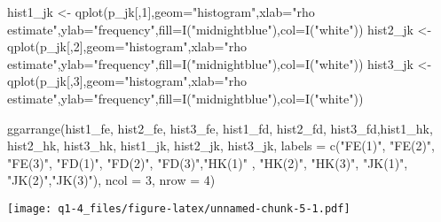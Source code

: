 \documentclass[
]{article}
\newenvironment{Shaded}{\begin{snugshade}}{\end{snugshade}}
\newcommand{\AttributeTok}[1]{\textcolor[rgb]{0.77,0.63,0.00}{#1}}
\newcommand{\DecValTok}[1]{\textcolor[rgb]{0.00,0.00,0.81}{#1}}
\newcommand{\FunctionTok}[1]{\textcolor[rgb]{0.00,0.00,0.00}{#1}}
\newcommand{\NormalTok}[1]{#1}
\newcommand{\OtherTok}[1]{\textcolor[rgb]{0.56,0.35,0.01}{#1}}
\newcommand{\StringTok}[1]{\textcolor[rgb]{0.31,0.60,0.02}{#1}}
\begin{document}
\begin{Shaded}
\begin{Highlighting}[]
\NormalTok{hist1\_jk }\OtherTok{\textless{}{-}} \FunctionTok{qplot}\NormalTok{(p\_jk[,}\DecValTok{1}\NormalTok{],}\AttributeTok{geom=}\StringTok{"histogram"}\NormalTok{,}\AttributeTok{xlab=}\StringTok{"rho estimate"}\NormalTok{,}\AttributeTok{ylab=}\StringTok{"frequency"}\NormalTok{,}\AttributeTok{fill=}\FunctionTok{I}\NormalTok{(}\StringTok{"midnightblue"}\NormalTok{),}\AttributeTok{col=}\FunctionTok{I}\NormalTok{(}\StringTok{"white"}\NormalTok{)) }
\NormalTok{hist2\_jk }\OtherTok{\textless{}{-}} \FunctionTok{qplot}\NormalTok{(p\_jk[,}\DecValTok{2}\NormalTok{],}\AttributeTok{geom=}\StringTok{"histogram"}\NormalTok{,}\AttributeTok{xlab=}\StringTok{"rho estimate"}\NormalTok{,}\AttributeTok{ylab=}\StringTok{"frequency"}\NormalTok{,}\AttributeTok{fill=}\FunctionTok{I}\NormalTok{(}\StringTok{"midnightblue"}\NormalTok{),}\AttributeTok{col=}\FunctionTok{I}\NormalTok{(}\StringTok{"white"}\NormalTok{)) }
\NormalTok{hist3\_jk }\OtherTok{\textless{}{-}} \FunctionTok{qplot}\NormalTok{(p\_jk[,}\DecValTok{3}\NormalTok{],}\AttributeTok{geom=}\StringTok{"histogram"}\NormalTok{,}\AttributeTok{xlab=}\StringTok{"rho estimate"}\NormalTok{,}\AttributeTok{ylab=}\StringTok{"frequency"}\NormalTok{,}\AttributeTok{fill=}\FunctionTok{I}\NormalTok{(}\StringTok{"midnightblue"}\NormalTok{),}\AttributeTok{col=}\FunctionTok{I}\NormalTok{(}\StringTok{"white"}\NormalTok{)) }

\FunctionTok{ggarrange}\NormalTok{(hist1\_fe, hist2\_fe, hist3\_fe, hist1\_fd, hist2\_fd, hist3\_fd,hist1\_hk, }
\NormalTok{          hist2\_hk, hist3\_hk, hist1\_jk, hist2\_jk, hist3\_jk,}
          \AttributeTok{labels =} \FunctionTok{c}\NormalTok{(}\StringTok{"FE(1)"}\NormalTok{, }\StringTok{"FE(2)"}\NormalTok{, }\StringTok{"FE(3)"}\NormalTok{, }\StringTok{"FD(1)"}\NormalTok{, }\StringTok{"FD(2)"}\NormalTok{, }\StringTok{"FD(3)"}\NormalTok{,}\StringTok{"HK(1)"}
\NormalTok{                     , }\StringTok{"HK(2)"}\NormalTok{,  }\StringTok{"HK(3)"}\NormalTok{, }\StringTok{"JK(1)"}\NormalTok{, }\StringTok{"JK(2)"}\NormalTok{,}\StringTok{"JK(3)"}\NormalTok{),}
          \AttributeTok{ncol =} \DecValTok{3}\NormalTok{, }\AttributeTok{nrow =} \DecValTok{4}\NormalTok{)}
\end{Highlighting}
\end{Shaded}

\texttt{[image: q1-4\_files/figure-latex/unnamed-chunk-5-1.pdf]}
\end{document}
